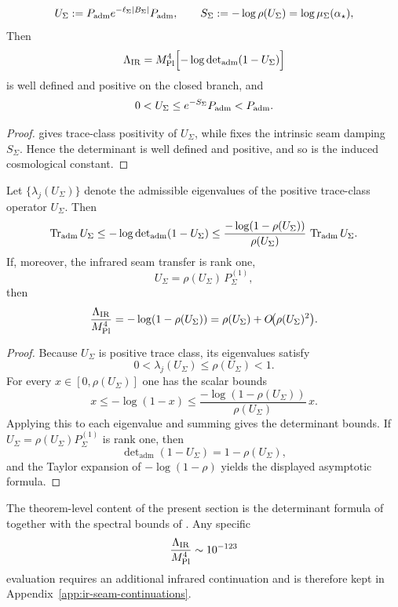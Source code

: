 \begin{theorem}
\label{thm:cosmology-closure}
\[
U_\Sigma:=P_{\mathrm{adm}} e^{-\ell_\Sigma |B_\Sigma|}P_{\mathrm{adm}},
\qquad
S_\Sigma:=-\log\rho(U_\Sigma)=\log\mu_\Sigma(\alpha_\star),
\]
Then
\[
\Lambda_{\mathrm{IR}}
=
M_{\mathrm{Pl}}^4
\Bigl[-\log\det\nolimits_{\mathrm{adm}}(1-U_\Sigma)\Bigr]
\]
is well defined and positive on the closed branch, and
\[
0<U_\Sigma\le e^{-S_\Sigma}P_{\mathrm{adm}}<P_{\mathrm{adm}}.
\]
\end{theorem}

\begin{proof}
 gives trace-class positivity of
$U_\Sigma$, while  fixes the intrinsic seam damping $S_\Sigma$.
Hence the determinant is well defined and positive, and so is the induced cosmological constant.
\end{proof}

\begin{corollary}
\label{cor:ir-seam-transfer-bounds}
Let $\{\lambda_j(U_\Sigma)\}$ denote the admissible eigenvalues of the positive trace-class
operator $U_\Sigma$. Then
\[
\operatorname{Tr}_{\mathrm{adm}}U_\Sigma
\le
-\log\det\nolimits_{\mathrm{adm}}(1-U_\Sigma)
\le
\frac{-\log(1-\rho(U_\Sigma))}{\rho(U_\Sigma)}\,\operatorname{Tr}_{\mathrm{adm}}U_\Sigma.
\]
If, moreover, the infrared seam transfer is rank one,
\[
U_\Sigma=\rho(U_\Sigma)\,P_\Sigma^{(1)},
\]
then
\[
\frac{\Lambda_{\mathrm{IR}}}{M_{\mathrm{Pl}}^4}
=
-\log(1-\rho(U_\Sigma))
=
\rho(U_\Sigma)+O\!\bigl(\rho(U_\Sigma)^2\bigr).
\]
\end{corollary}

\begin{proof}
Because $U_\Sigma$ is positive trace class, its eigenvalues satisfy
\[
0<\lambda_j(U_\Sigma)\le \rho(U_\Sigma)<1.
\]
For every $x\in[0,\rho(U_\Sigma)]$ one has the scalar bounds
\[
x\le -\log(1-x)\le \frac{-\log(1-\rho(U_\Sigma))}{\rho(U_\Sigma)}\,x.
\]
Applying this to each eigenvalue and summing gives the determinant bounds. If
$U_\Sigma=\rho(U_\Sigma)P_\Sigma^{(1)}$ is rank one, then
\[
\det\nolimits_{\mathrm{adm}}(1-U_\Sigma)=1-\rho(U_\Sigma),
\]
and the Taylor expansion of $-\log(1-\rho)$ yields the displayed asymptotic formula.
\end{proof}

\begin{remark}
The theorem-level content of the present section is the determinant formula of
 together with the spectral bounds of
. Any specific
\[
\frac{\Lambda_{\mathrm{IR}}}{M_{\mathrm{Pl}}^4}\sim 10^{-123}
\]
evaluation requires an additional infrared continuation and is therefore kept in
Appendix~\ref{app:ir-seam-continuations}.
\end{remark}

